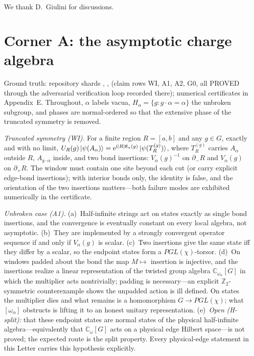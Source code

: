 \documentclass[aps,prl,twocolumn,superscriptaddress,longbibliography,floatfix]{revtex4-2}
\newcommand{\ic}{\ensuremath{\mathrm{i}}}
\newcommand{\ec}{\ensuremath{\mathrm{e}}}
\begin{document}
\begin{acknowledgments}
We thank D.~Giulini for discussions. %
\end{acknowledgments}

\appendix

\section{Corner A: the asymptotic charge algebra}\label{app:cornerA}

\begingroup\raggedright
Ground truth: repository shards ,
,  (claim rows WI,
A1, A2, G0, all PROVED through the adversarial verification loop recorded
there); numerical certificates in Appendix~E. Throughout, $\alpha$ labels
vacua, $H_\alpha=\{g:g\cdot\alpha=\alpha\}$ the unbroken subgroup, and
phases are normal-ordered so that the extensive phase of the truncated
symmetry is removed.
\par\endgroup

\emph{Truncated symmetry (WI).} For a finite region $R=[a,b]$ and any
$g\in G$, exactly and with no limit,
$U_R(g)\ket{\psi(A_\alpha)}=\ec^{\ic|R|\theta_\alpha(g)}
\ket{\psi(T^{(g)}_R)}$, where $T^{(g)}_R$ carries $A_\alpha$ outside $R$,
$A_{g\cdot\alpha}$ inside, and two bond insertions: $V_\alpha(g)^{-1}$ on
$\partial_-R$ and $V_\alpha(g)$ on $\partial_+R$. The window must contain
one site beyond each cut (or carry explicit edge-bond insertions); with
interior bonds only, the identity is false, and the orientation of the two
insertions matters---both failure modes are exhibited numerically in the
certificate.

\emph{Unbroken case (A1).} (a)~Half-infinite strings act on states exactly
as single bond insertions, and the convergence is eventually constant on
every local algebra, not asymptotic. (b)~They are implemented by a strongly
convergent operator sequence if and only if $V_\alpha(g)$ is scalar.
(c)~Two insertions give the same state iff they differ by a scalar, so the
endpoint states form a $PGL(\chi)$-torsor. (d)~On windows padded about the
bond the map $M\mapsto$ insertion is injective, and the insertions realize
a linear representation of the twisted group algebra
$\mathbb{C}_{\omega_\alpha}[G]$ in which the multiplier acts nontrivially;
padding is necessary---an explicit $\mathbb{Z}_2$-symmetric counterexample
shows the unpadded action is ill defined. On states the multiplier dies and
what remains is a homomorphism $G\to PGL(\chi)$; what $[\omega_\alpha]$
obstructs is lifting it to an honest unitary representation.
(e)~\emph{Open (H-split):} that these endpoint states are normal states of
the physical half-infinite algebra---equivalently that
$\mathbb{C}_\omega[G]$ acts on a physical edge Hilbert space---is not
proved; the expected route is the split property. Every physical-edge
statement in this Letter carries this hypothesis explicitly.
\end{document}
